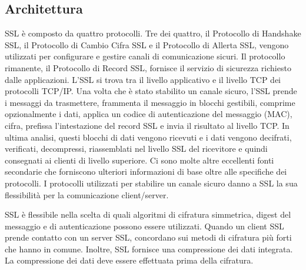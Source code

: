 \documentclass{article}
\theoremstyle{definition}
\begin{document}




\subsection{Architettura}
SSL è composto da quattro protocolli. Tre dei quattro, il Protocollo di Handshake SSL, il Protocollo di Cambio Cifra SSL e il Protocollo di Allerta SSL, vengono utilizzati per configurare e gestire canali di comunicazione sicuri. Il protocollo rimanente, il Protocollo di Record SSL, fornisce il servizio di sicurezza richiesto dalle applicazioni. L'SSL si trova tra il livello applicativo e il livello TCP dei protocolli TCP/IP. Una volta che è stato stabilito un canale sicuro, l'SSL prende i messaggi da trasmettere, frammenta il messaggio in blocchi gestibili, comprime opzionalmente i dati, applica un codice di autenticazione del messaggio (MAC), cifra, prefissa l'intestazione del record SSL e invia il risultato al livello TCP. In ultima analisi, questi blocchi di dati vengono ricevuti e i dati vengono decifrati, verificati, decompressi, riassemblati nel livello SSL del ricevitore e quindi consegnati ai clienti di livello superiore.
Ci sono molte altre eccellenti fonti secondarie che forniscono ulteriori informazioni di base oltre alle specifiche dei protocolli. I protocolli utilizzati per stabilire un canale sicuro danno a SSL la sua flessibilità per la comunicazione client/server.

SSL è flessibile nella scelta di quali algoritmi di cifratura simmetrica, digest del messaggio e di autenticazione possono essere utilizzati. Quando un client SSL prende contatto con un server SSL, concordano sui metodi di cifratura più forti che hanno in comune. Inoltre, SSL fornisce una compressione dei dati integrata. La compressione dei dati deve essere effettuata prima della cifratura.
\end{document}
